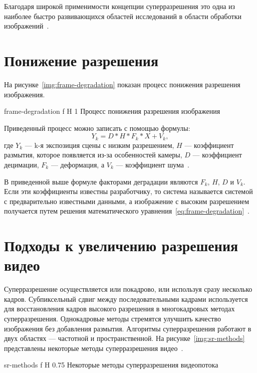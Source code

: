 \documentclass{bmstu}
\begin{document}
Благодаря широкой применимости концепции суперразрешения это одна из наиболее быстро развивающихся областей исследований в области обработки изображений~\cite{Yue2016}.

\section{Понижение разрешения}

На рисунке~\ref{img:frame-degradation} показан процесс понижения разрешения изображения.

    {frame-degradation}
    {f}
    {H}
    {1\textwidth}
    {Процесс понижения разрешения изображения~\cite{Daithankar2021}}
    
Приведенный процесс можно записать с помощью формулы:
\begin{equation} 
\label{eq:frame-degradation}
Y_{k} = D * H * F_{k} * X + V_{k},
\end{equation}
где $Y_{k}$ --- k-я экспозиция сцены с низким разрешением, $H$ --- коэффициент размытия, которое появляется из-за особенностей камеры, $D$ --- коэффициент децимации, $F_{k}$ --- деформация, а $V_{k}$ --- коэффициент шума~\cite{Daithankar2021}.

В приведенной выше формуле факторами деградации являются $F_{k}$, $H$, $D$ и $V_{k}$. 
Если эти коэффициенты известны разработчику, то система называется системой с предварительно известными данными, а изображение с высоким разрешением получается путем решения математического уравнения~\ref{eq:frame-degradation}~\cite{Daithankar2021}.

\section{Подходы к увеличению разрешения видео}

Суперразрешение осуществляется или покадрово, или используя сразу несколько кадров. 
Субпиксельный сдвиг между последовательными кадрами используется для восстановления кадров высокого разрешения в многокадровых методах суперразрешения. 
Однокадровые методы стремятся улучшить качество изображения без добавления размытия. 
Алгоритмы суперразрешения работают в двух областях --- частотной и пространственной. 
На рисунке~\ref{img:sr-methods} представлены некоторые методы суперразрешения видео~\cite{Daithankar2021}.

    {sr-methods}
    {f}
    {H}
    {0.75\textwidth}
    {Некоторые методы суперразрешения видеопотока~\cite{Daithankar2021}}
\end{document}
